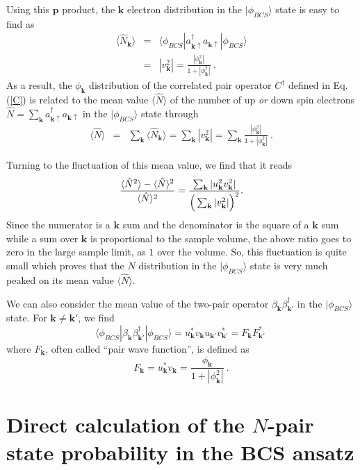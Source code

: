 \documentclass[twocolumn,showpacs]{revtex4}
\def\v#1{\mathbf{#1}}
\begin{document}
Using this $\v p$ product, the $\v k$ electron distribution in the $|\phi_{BCS}\rangle$ state is easy to find as
\begin{eqnarray}
\langle\hat{N}_{\v k}\rangle&=&\langle\phi_{BCS}|a_{\v k\uparrow}^\dag a_{\v k\uparrow}|\phi_{BCS}\rangle\nonumber\\
&=&|v_{\v k}^2|=\frac{|\phi_{\v k}^2|}{1+|\phi_{\v k}^2|}\ .
\end{eqnarray}
As a result, the $\phi_{\v k}$ distribution of the correlated pair operator $C^\dag$ defined in Eq.(\ref{C}) is related to the mean value $\langle\hat{N}\rangle$ of the number of up \emph{or} down spin electrons $\hat{N}=\sum_{\v k}a_{\v k\uparrow}^\dag a_{\v k\uparrow}$ in the $|\phi_{BCS}\rangle$ state through
\begin{eqnarray}
\langle\hat{N}\rangle&=&\sum_{\v k}\langle\hat{N}_{\v k}\rangle=\sum_{\v{k}}|v_{\v k}^2|
=\sum_{\v k}\frac{|\phi_{\v k}^2|}{1+|\phi_{\v k}^2|}\ .
\end{eqnarray}

Turning to the fluctuation of this mean value, we find that it reads
\begin{equation}
\frac{\langle\hat{N}^2\rangle-\langle\hat{N}\rangle^2}{\langle\hat{N}\rangle^2}=\frac{\sum_{\v k}|u_{\v k}^2v_{\v k}^2|}{\Big{(}\sum_{\v k}|v_{\v k}^2|\Big{)}^2}.
\end{equation}
Since the numerator is a $\v k$ sum and  the denominator is the square of a $\v k$ sum while a sum over $\v{k}$ is proportional to the sample volume, the above ratio goes to zero in the large sample limit, as $1$ over the volume. So, this fluctuation is quite small which proves that the $N$ distribution in the $|\phi_{BCS}\rangle$ state is very much peaked on its mean value $\langle\hat{N}\rangle$.

We can also consider the mean value of the two-pair operator $\beta_{\v k}\beta_{\v k'}^\dag$ in the $|\phi_{BCS}\rangle$ state. For $\v k\neq\v k'$, we find
\begin{equation}
\langle\phi_{BCS}|\beta_{\v k}\beta_{\v k'}^\dag|\phi_{BCS}\rangle=u_{\v k}^\ast v_{\v k}u_{\v k'}v_{\v k'}^\ast=F_{\v k}F_{\v k'}^\ast\ 
\end{equation}
where $F_{\v k}$, often called ``pair wave function'', is defined as
\begin{equation}\label{fn}
F_{\v k}=u_{\v k}^\ast v_{\v k}=\frac{\phi_{\v k}}{1+|\phi_{\v k}^2|}\ .
\end{equation}

\section{Direct calculation of the $N$-pair state probability in the BCS ansatz}
\end{document}
